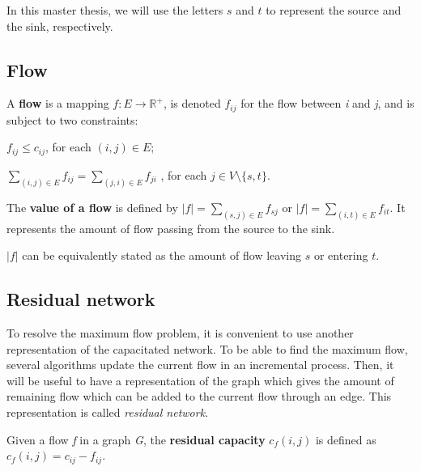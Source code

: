 In this master thesis, we will use the letters $s$ and $t$ to represent the source and the sink, respectively.

\subsection{Flow}
\begin{definition}
\label{flow}
A \textbf{flow} is a mapping $f: E \to \mathbb{R}^{+}$, is denoted $f_{ij}$ for the flow between \textit{i} and \textit{j}, and is subject to two constraints:
\indent
\begin{description}
	\label{cap_constraint}
	\item[Capacity constraint] $f_{ij} \leq c_{ij}$, for each $(i, j) \in E$;
	\label{flow_constraint}
	\item[Flow conservation constraint] $\sum\limits_{(i, j) \in E} f_{ij} = \sum\limits_{(j, i) \in E} f_{ji}$ , for each $j \in V \setminus \{s, t\}$.
\end{description}
\end{definition}

\begin{definition}
\label{vflow}
The \textbf{value of a flow} is defined by $\left\vert{f}\right\vert = \sum\limits_{(s,j) \in E} f_{sj}$ or $\left\vert{f}\right\vert = \sum\limits_{(i,t) \in E} f_{it}$. It represents the amount of flow passing from the source to the sink.
\end{definition}

$\left\vert{f}\right\vert$ can be equivalently stated as the amount of flow leaving $s$ or entering $t$.

\subsection{Residual network} 
To resolve the maximum flow problem, it is convenient to use another representation of the capacitated network. To be able to find the maximum flow, several algorithms update the current flow in an incremental process. Then, it will be useful to have a representation of the graph which gives the amount of remaining flow which can be added to the current flow through an edge. This representation is called \textit{residual network}.
\begin{definition}
\label{rcapacity}
Given a flow \textit{f} in a graph \textit{G}, the \textbf{residual capacity} $c_f (i,j)$ is defined as $c_f (i,j) = c_{ij} - f_{ij}$.
\end{definition}


